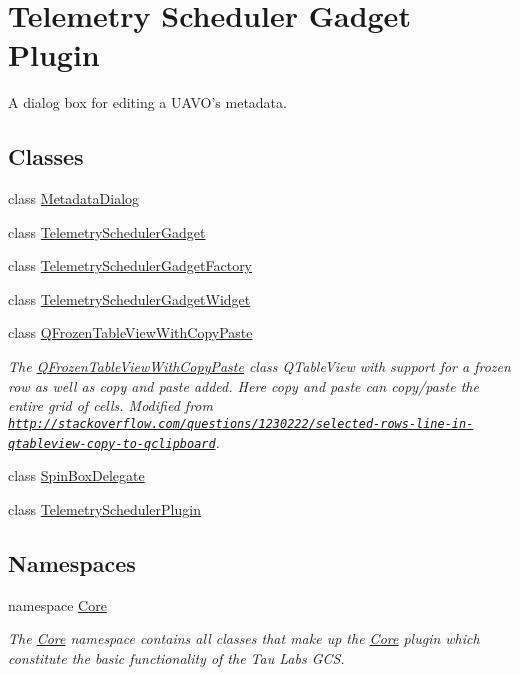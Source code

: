 \hypertarget{group___telemetry_scheduler_gadget_plugin}{\section{\-Telemetry \-Scheduler \-Gadget \-Plugin}
\label{group___telemetry_scheduler_gadget_plugin}
}


\-A dialog box for editing a \-U\-A\-V\-O's metadata.  


\subsection*{\-Classes}
\begin{DoxyCompactItemize}
\item 
class \hyperlink{class_metadata_dialog}{\-Metadata\-Dialog}
\item 
class \hyperlink{class_telemetry_scheduler_gadget}{\-Telemetry\-Scheduler\-Gadget}
\item 
class \hyperlink{class_telemetry_scheduler_gadget_factory}{\-Telemetry\-Scheduler\-Gadget\-Factory}
\item 
class \hyperlink{class_telemetry_scheduler_gadget_widget}{\-Telemetry\-Scheduler\-Gadget\-Widget}
\item 
class \hyperlink{class_q_frozen_table_view_with_copy_paste}{\-Q\-Frozen\-Table\-View\-With\-Copy\-Paste}
\begin{DoxyCompactList}\small\item\em \-The \hyperlink{class_q_frozen_table_view_with_copy_paste}{\-Q\-Frozen\-Table\-View\-With\-Copy\-Paste} class \-Q\-Table\-View with support for a frozen row as well as copy and paste added. \-Here copy and paste can copy/paste the entire grid of cells. \-Modified from \href{http://stackoverflow.com/questions/1230222/selected-rows-line-in-qtableview-copy-to-qclipboard}{\tt http\-://stackoverflow.\-com/questions/1230222/selected-\/rows-\/line-\/in-\/qtableview-\/copy-\/to-\/qclipboard}. \end{DoxyCompactList}\item 
class \hyperlink{class_spin_box_delegate}{\-Spin\-Box\-Delegate}
\item 
class \hyperlink{class_telemetry_scheduler_plugin}{\-Telemetry\-Scheduler\-Plugin}
\end{DoxyCompactItemize}
\subsection*{\-Namespaces}
\begin{DoxyCompactItemize}
\item 
namespace \hyperlink{namespace_core}{\-Core}
\begin{DoxyCompactList}\small\item\em \-The \hyperlink{namespace_core}{\-Core} namespace contains all classes that make up the \hyperlink{namespace_core}{\-Core} plugin which constitute the basic functionality of the \-Tau \-Labs \-G\-C\-S. \end{DoxyCompactList}\end{DoxyCompactItemize}

